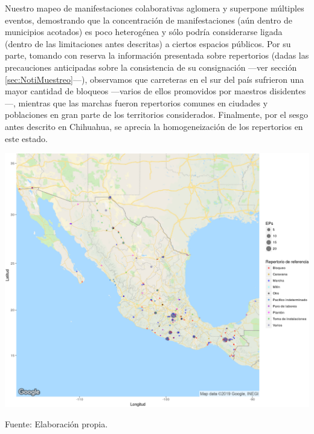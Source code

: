\documentclass[letterpaper, 11pt]{book}
\theoremstyle{definition}
\theoremstyle{remark}
\begin{document}
Nuestro mapeo de manifestaciones colaborativas aglomera y superpone múltiples eventos, demostrando que la concentración de manifestaciones (aún dentro de municipios acotados) es poco heterogénea y sólo podría considerarse ligada (dentro de las limitaciones antes descritas) a ciertos espacios públicos. 
Por su parte, tomando con reserva la información presentada sobre repertorios (dadas las precauciones anticipadas sobre la consistencia de su consignación ---ver sección \ref{sec:NotiMuestreo}---), observamos que carreteras en el sur del país sufrieron una mayor cantidad de bloqueos ---varios de ellos promovidos por maestros disidentes---, mientras que las marchas fueron repertorios comunes en ciudades y poblaciones en gran parte de los territorios considerados. 
Finalmente, por el sesgo antes descrito en Chihuahua, se aprecia la homogeneización de los repertorios en este estado. 


\hspace{-2em}\begin{minipage}{\linewidth}
\centering
{} \label{3.8_epsGeolocalizacion}
\includegraphics[scale=0.53]{img/3.8_epsGeolocalizacion.png}
\par\bigskip
\small Fuente: Elaboración propia.
\end{minipage}\bigskip
\end{document}
